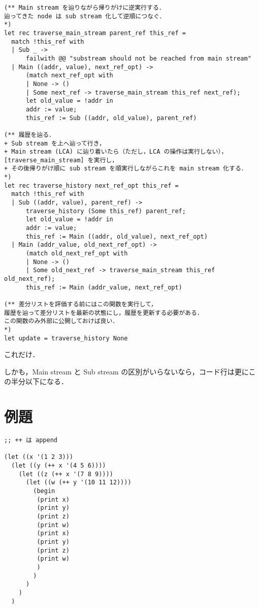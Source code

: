 \documentclass[10pt, a4j, twocolumn]{scrartcl}
\begin{document}
\begin{lstlisting}
(** Main stream を辿りながら帰りがけに逆実行する．
辿ってきた node は sub stream 化して逆順につなぐ．
*)
let rec traverse_main_stream parent_ref this_ref =
  match !this_ref with
  | Sub _ -> 
      failwith @@ "substream should not be reached from main stream"
  | Main ((addr, value), next_ref_opt) ->
      (match next_ref_opt with
      | None -> ()
      | Some next_ref -> traverse_main_stream this_ref next_ref);
      let old_value = !addr in
      addr := value;
      this_ref := Sub ((addr, old_value), parent_ref)

(** 履歴を辿る．
+ Sub stream を上へ辿って行き，
+ Main stream (LCA) に辿り着いたら（ただし，LCA の操作は実行しない），[traverse_main_stream] を実行し，
+ その後帰りがけ順に sub stream を順実行しながらこれを main stream 化する．
*)
let rec traverse_history next_ref_opt this_ref =
  match !this_ref with
  | Sub ((addr, value), parent_ref) ->
      traverse_history (Some this_ref) parent_ref;
      let old_value = !addr in
      addr := value;
      this_ref := Main ((addr, old_value), next_ref_opt)
  | Main (addr_value, old_next_ref_opt) ->
      (match old_next_ref_opt with
      | None -> ()
      | Some old_next_ref -> traverse_main_stream this_ref old_next_ref);
      this_ref := Main (addr_value, next_ref_opt)

(** 差分リストを評価する前にはこの関数を実行して，
履歴を辿って差分リストを最新の状態にし，履歴を更新する必要がある．
この関数のみ外部に公開しておけば良い．
*)
let update = traverse_history None
\end{lstlisting}


これだけ．

しかも，Main stream と Sub stream の区別がいらないなら，コード行は更にこの半分以下になる．


\section{例題}
\label{sec:org9031bd8}

\begin{lstlisting}
;; ++ は append

(let ((x '(1 2 3)))
  (let ((y (++ x '(4 5 6))))
    (let ((z (++ x '(7 8 9))))
      (let ((w (++ y '(10 11 12))))
        (begin
         (print x)
         (print y)
         (print z)
         (print w)
         (print x)
         (print y)
         (print z)
         (print w)
         )
        )
      )
    )
  )
\end{lstlisting}
\end{document}

